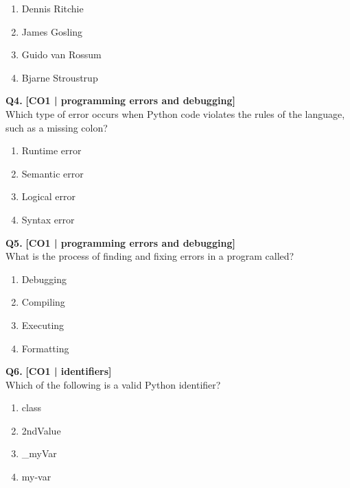 \begin{enumerate}[label=(\alph*),topsep=2pt,itemsep=1pt,partopsep=0pt,parsep=0pt]
    \item \relax Dennis Ritchie
    \item \relax James Gosling
    \item \relax Guido van Rossum
    \item \relax Bjarne Stroustrup
\end{enumerate}
\vspace{{2mm}}

\noindent\textbf{Q4.} \hfill {\small\color{LPUOrange}\textbf{[CO1 | programming errors and debugging]}}\\[2pt]
Which type of error occurs when Python code violates the rules of the language, such as a missing colon?

\begin{enumerate}[label=(\alph*),topsep=2pt,itemsep=1pt,partopsep=0pt,parsep=0pt]
    \item \relax Runtime error
    \item \relax Semantic error
    \item \relax Logical error
    \item \relax Syntax error
\end{enumerate}
\vspace{{2mm}}

\noindent\textbf{Q5.} \hfill {\small\color{LPUOrange}\textbf{[CO1 | programming errors and debugging]}}\\[2pt]
What is the process of finding and fixing errors in a program called?

\begin{enumerate}[label=(\alph*),topsep=2pt,itemsep=1pt,partopsep=0pt,parsep=0pt]
    \item \relax Debugging
    \item \relax Compiling
    \item \relax Executing
    \item \relax Formatting
\end{enumerate}
\vspace{{2mm}}

\noindent\textbf{Q6.} \hfill {\small\color{LPUOrange}\textbf{[CO1 | identifiers]}}\\[2pt]
Which of the following is a valid Python identifier?

\begin{enumerate}[label=(\alph*),topsep=2pt,itemsep=1pt,partopsep=0pt,parsep=0pt]
    \item \relax class
    \item \relax 2ndValue
    \item \relax \_myVar
    \item \relax my-var
\end{enumerate}
\vspace{{2mm}}

